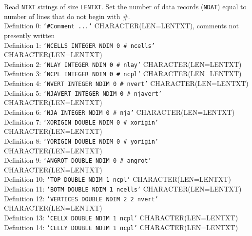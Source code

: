 \vspace{5mm}
\noindent Read \texttt{NTXT} strings of size \texttt{LENTXT}. Set the number of data records (\texttt{NDAT}) equal to number of lines that do not begin with \#.  \\
\noindent Definition 0: \texttt{`\#Comment ...'} {\color{red} \footnotesize{CHARACTER(LEN=LENTXT)}, comments not presently written} \\
\noindent Definition 1: \texttt{`NCELLS INTEGER NDIM 0 \# ncells'} {\color{red} \footnotesize{CHARACTER(LEN=LENTXT)}} \\
\noindent Definition 2: \texttt{`NLAY INTEGER NDIM 0 \# nlay'} {\color{red} \footnotesize{CHARACTER(LEN=LENTXT)}} \\
\noindent Definition 3: \texttt{`NCPL INTEGER NDIM 0 \# ncpl'} {\color{red} \footnotesize{CHARACTER(LEN=LENTXT)}} \\
\noindent Definition 4: \texttt{`NVERT INTEGER NDIM 0 \# nvert'} {\color{red} \footnotesize{CHARACTER(LEN=LENTXT)}} \\
\noindent Definition 5: \texttt{`NJAVERT INTEGER NDIM 0 \# njavert'} {\color{red} \footnotesize{CHARACTER(LEN=LENTXT)}} \\
\noindent Definition 6: \texttt{`NJA INTEGER NDIM 0 \# nja'} {\color{red} \footnotesize{CHARACTER(LEN=LENTXT)}} \\
\noindent Definition 7: \texttt{`XORIGIN DOUBLE NDIM 0 \# xorigin'} {\color{red} \footnotesize{CHARACTER(LEN=LENTXT)}} \\
\noindent Definition 8: \texttt{`YORIGIN DOUBLE NDIM 0 \# yorigin'} {\color{red} \footnotesize{CHARACTER(LEN=LENTXT)}} \\
\noindent Definition 9: \texttt{`ANGROT DOUBLE NDIM 0 \# angrot'} {\color{red} \footnotesize{CHARACTER(LEN=LENTXT)}} \\
\noindent Definition 10: \texttt{`TOP DOUBLE NDIM 1 ncpl'} {\color{red} \footnotesize{CHARACTER(LEN=LENTXT)}} \\
\noindent Definition 11: \texttt{`BOTM DOUBLE NDIM 1 ncells'} {\color{red} \footnotesize{CHARACTER(LEN=LENTXT)}} \\
\noindent Definition 12: \texttt{`VERTICES DOUBLE NDIM 2 2 nvert'} {\color{red} \footnotesize{CHARACTER(LEN=LENTXT)}} \\
\noindent Definition 13: \texttt{`CELLX DOUBLE NDIM 1 ncpl'} {\color{red} \footnotesize{CHARACTER(LEN=LENTXT)}} \\
\noindent Definition 14: \texttt{`CELLY DOUBLE NDIM 1 ncpl'} {\color{red} \footnotesize{CHARACTER(LEN=LENTXT)}} \\
